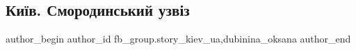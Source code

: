  
 
 
 
 
 
\subsection{Київ. Смородинський узвіз}
\label{sec:27_04_2022.fb.fb_group.story_kiev_ua.1.smorodinskij_uzviz}
 
\ifcmt
 author_begin
   author_id fb_group.story_kiev_ua,dubinina_oksana
 author_end
\fi
